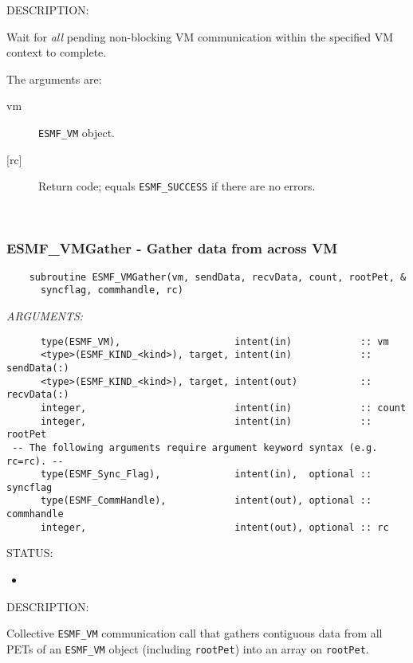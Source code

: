 {\sf DESCRIPTION:\\ }


     Wait for {\em all} pending non-blocking VM communication within the 
     specified VM context to complete.
  
     The arguments are:
     \begin{description}
     \item[vm] 
          {\tt ESMF\_VM} object.
     \item[{[rc]}] 
          Return code; equals {\tt ESMF\_SUCCESS} if there are no errors.
     \end{description}
   
 
\mbox{}\hrulefill\ 
 
\subsubsection [ESMF\_VMGather] {ESMF\_VMGather - Gather data from across VM}


  
\begin{verbatim}    subroutine ESMF_VMGather(vm, sendData, recvData, count, rootPet, &
      syncflag, commhandle, rc)\end{verbatim}{\em ARGUMENTS:}
\begin{verbatim}      type(ESMF_VM),                    intent(in)            :: vm
      <type>(ESMF_KIND_<kind>), target, intent(in)            :: sendData(:)
      <type>(ESMF_KIND_<kind>), target, intent(out)           :: recvData(:)
      integer,                          intent(in)            :: count
      integer,                          intent(in)            :: rootPet
 -- The following arguments require argument keyword syntax (e.g. rc=rc). --
      type(ESMF_Sync_Flag),             intent(in),  optional :: syncflag
      type(ESMF_CommHandle),            intent(out), optional :: commhandle
      integer,                          intent(out), optional :: rc\end{verbatim}
{\sf STATUS:}
   \begin{itemize}
   \item{}
   \end{itemize}
  
{\sf DESCRIPTION:\\ }


     Collective {\tt ESMF\_VM} communication call that gathers contiguous data 
     from all PETs of an {\tt ESMF\_VM} object (including {\tt rootPet}) into an
     array on {\tt rootPet}.
  

